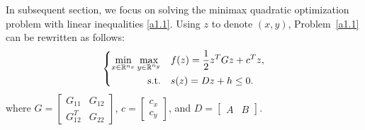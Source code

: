 \documentclass{article}
\begin{document}
	In subsequent section, we focus on solving the minimax quadratic optimization problem with linear inequalities \eqref{a1.1}. Using $z$ to denote $(x, y)$, Problem~\eqref{a1.1} can be rewritten as follows:
	\begin{align}\label{realPro}
		\left\lbrace
		\begin{aligned}
			\min_{x\in\mathbb{R}^{n_{x}}}\max_{y\in\mathbb{R}^{n_{y}}}\quad& f(z) = \frac{1}{2}z^{T}Gz + c^{T}z,\\
			{\rm s.t.}\quad & s(z) = Dz + h \leq 0.
		\end{aligned}\right.
	\end{align}
	where $G = \begin{bmatrix}
		G_{11} & G_{12}\\
		G_{12}^{T} & G_{22}
	\end{bmatrix}$, $c = \begin{bmatrix}
		c_{x}\\
		c_{y}
	\end{bmatrix}$, and $D = \begin{bmatrix}
		A & B
	\end{bmatrix}$.
	
\end{document}
